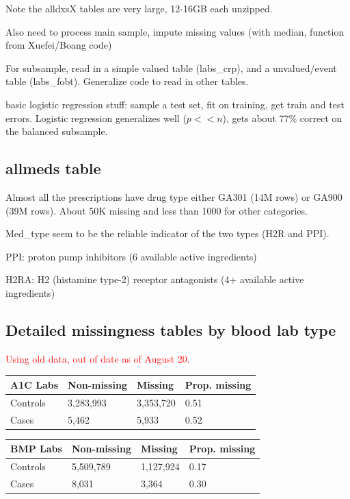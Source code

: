 \documentclass[12pt]{article}
\newcommand{\note}[1]{\textcolor{red}{#1}}
\begin{document}
Note the alldxsX tables are very large, 12-16GB each unzipped.

Also need to process main sample, impute missing values (with median, function from Xuefei/Boang code)

For subsample, read in a simple valued table (labs\_crp), and a unvalued/event table (labs\_fobt). Generalize code to read in other tables.

basic logistic regression stuff: sample a test set, fit on training, get train and test errors. Logistic regression generalizes well ($p << n$), gets about 77\% correct on the balanced subsample.

\subsection*{allmeds table}

Almost all the prescriptions have drug type either GA301 (14M rows) or GA900 (39M rows). About 50K missing and less than 1000 for other categories.

Med\_type seem to be the reliable indicator of the two types (H2R and PPI).

PPI: proton pump inhibitors (6 available active ingredients)

H2RA: H2 (histamine type-2) receptor antagonists (4+ available active ingredients)

\subsection*{Detailed missingness tables by blood lab type}

\note{Using old data, out of date as of August 20.}

\begin{center}
\begin{tabular}{|l|l|l|l|}
\hline
\textbf{A1C Labs} & Non-missing & Missing & Prop. missing \\ \hline
Controls & 3,283,993 & 3,353,720 & 0.51 \\ \hline
Cases & 5,462 & 5,933 & 0.52 \\ \hline
\end{tabular}
\end{center}

\begin{center}
\begin{tabular}{|l|l|l|l|}
\hline
\textbf{BMP Labs} & Non-missing & Missing & Prop. missing \\ \hline
Controls & 5,509,789 & 1,127,924 & 0.17 \\ \hline
Cases & 8,031 & 3,364 & 0.30 \\ \hline
\end{tabular}
\end{center}
\end{document}
